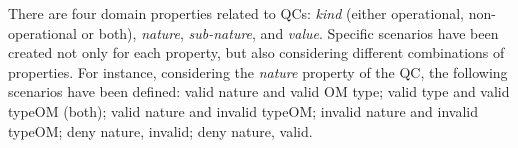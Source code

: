 \documentclass[twocolumn]{bmcart}%
\begin{document}

There are four domain properties related to QCs:
\emph{kind} (either operational, non-operational or both),
\emph{nature}, \emph{sub-nature}, and \emph{value}. Specific scenarios have been created not only for each property, but also considering different
combinations of properties. For instance, considering the \emph{nature} property of the QC, the following scenarios have been defined: valid nature and valid OM type; valid type and valid typeOM (both); valid nature and invalid typeOM; invalid nature and invalid typeOM; deny nature, invalid; deny nature, valid.    






\end{document}
